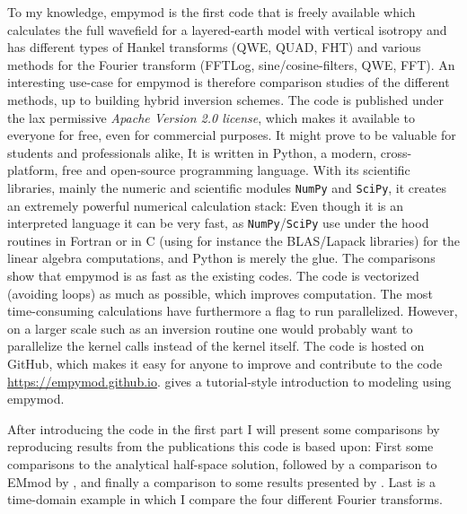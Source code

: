\documentclass[paper]{geophysics}
\begin{document}
To my knowledge, empymod is the first code that is freely available which
calculates the full wavefield for a layered-earth model with vertical isotropy
and has different types of Hankel transforms (QWE, QUAD, FHT) and various
methods for the Fourier transform (FFTLog, sine/cosine-filters, QWE, FFT). An
interesting use-case for empymod is therefore comparison studies of the
different methods, up to building hybrid inversion schemes. The code is
published under the lax permissive \emph{Apache Version 2.0 license}, which
makes it available to everyone for free, even for commercial purposes. It
 might  prove to be valuable for students and
professionals alike,  It is written in Python, a modern, cross-platform, free and
open-source programming language. With its scientific libraries, mainly the
numeric and scientific modules \texttt{NumPy} and \texttt{SciPy}, it creates an
extremely powerful numerical calculation stack: Even though it is an
interpreted language it can be very fast, as \texttt{NumPy}/\texttt{SciPy} use
under the hood routines in Fortran or in C (using for instance the BLAS/Lapack
libraries) for the linear algebra computations, and Python is merely the glue.
The comparisons show that empymod is as fast as the existing codes. The code is
vectorized (avoiding loops) as much as possible, which improves computation.
The most time-consuming calculations have furthermore a flag to run
parallelized.  However, on a larger scale such as an inversion routine one
would probably want to parallelize the kernel calls instead of the kernel
itself. The code is hosted on GitHub, which makes it easy for anyone to improve
and contribute to the code
 \url{https://empymod.github.io}.%
\cite{TLE.17.Werthmuller} gives a tutorial-style introduction to
 modeling using empymod.

After introducing the code in the first part I will present some comparisons by
reproducing results from the publications this code is based upon: First some
comparisons to the analytical half-space solution, followed by a comparison to
EMmod by \cite{GEO.15.Hunziker}, and finally a comparison to some results
presented by \cite{GEO.12.Key}. Last is a time-domain example in which I
compare the four different Fourier transforms.
\end{document}
